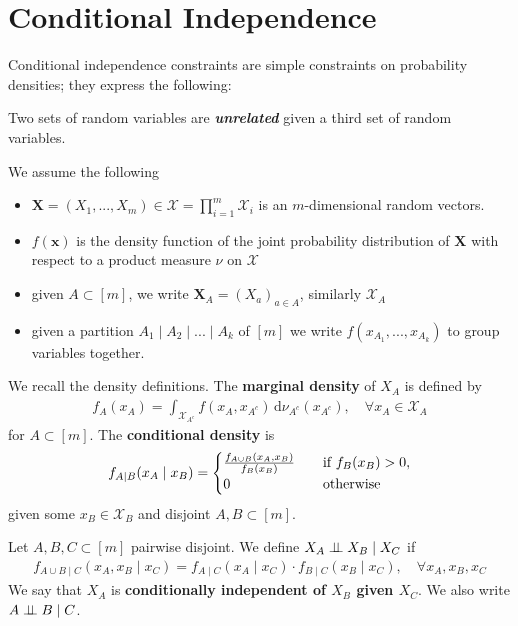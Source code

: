 \section{Conditional Independence}

Conditional independence constraints are simple constraints on probability densities; they express the following:
\begin{mdframed}
  \begin{center}

  Two sets of random variables are \emph{\textbf{unrelated}} given a third set of random variables. 
\end{center}
\end{mdframed}  
We assume the following
\begin{itemize}
  \item \( {\mathbf X} = (X_1, ..., X_m) \in  \mathcal{X} = \prod^m_{i=1} \mathcal{X}_i \) is an \( m \)-dimensional random vectors.  
  \item \( f(\mathbf x)  \) is the density function of the joint probability distribution of \( \mathbf X \) with respect to a product measure \( \nu \) on \( \mathcal{X} \)
  \item given \( A \subset [m] \), we write \( \mathbf X_A = (X_a)_{a \in A} \), similarly \( \mathcal{X}_A \)
  \item given a partition \( A_1 \mid A_2 \mid ... \mid A_k \) of \( [m] \) we write \( f(x_{A_1}, ... , x_{A_k}) \) to group variables together.
\end{itemize}


We recall the density definitions. The \textbf{marginal density} of \( X_A \) is defined by \begin{align*}
  f_A(x_A) = \int_{\mathcal{X}_{A^c}} f(x_A, x_{A^c}) \, \mathrm{d}\nu_{A^c}(x_{A^c}), \quad \forall x_A \in \mathcal{X}_A
\end{align*}
for \( A \subset [m] \). The \textbf{conditional density} is 
\begin{align*}
  f_{A \mid B} (x_A \mid x_B) =
  \begin{cases}
     \frac{f_{A \cup B} (x_A, x_B)}{f_B(x_B)} &\quad \text{if \( f_B(x_B) > 0 \)}, \\ 0 &\quad \text{otherwise}
  \end{cases}
\end{align*}
given some \( x_B \in \mathcal{X}_B \) and disjoint \( A, B \subset [m] \).

\begin{mdframed}
\begin{defi}\(  \) \\
Let \( A,B,C \subset [m] \) pairwise disjoint. We define  \( X_A \perp \!\!\! \perp X_B \mid X_C \) if
\begin{align*}
  f_{A \cup B \mid C} (x_A,x_B \mid x_C) = f_{A \mid C} (x_A \mid x_C)\cdot f_{B \mid C} (x_B \mid x_C), \quad \forall x_A, x_B , x_C
\end{align*}
We say that \( X_A \) is \textbf{conditionally independent  of \( X_B \) given \( X_C \)}. We also write \( A \perp \!\!\! \perp B \mid C \).
\end{defi}
\end{mdframed}

